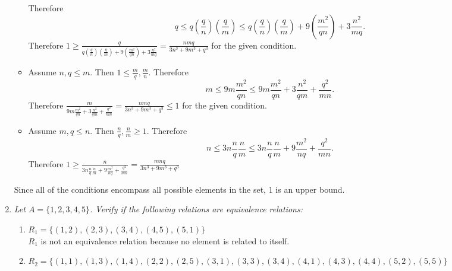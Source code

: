 \documentclass[12pt, letterpaper]{article}
\begin{document}
\begin{enumerate}
\begin{itemize}
		Therefore
		$$
		q \leq q(\frac{q}{n})(\frac{q}{m}) \leq q(\frac{q}{n})(\frac{q}{m}) + 9(\frac{m^2}{qn}) + 3\frac{n^2}{mq}.
		$$
		Therefore $1 \geq \frac{q}{q(\frac{q}{n})(\frac{q}{m}) + 9(\frac{m^2}{qn}) + 3\frac{n^2}{mq}} = \frac{nmq}{3n^3 + 9m^3 + q^3}$ for the given condition.
		\item Assume $n,q \leq m$. Then $1\leq \frac{m}{q},\frac{m}{n}$.
		Therefore
		$$
		m \leq 9 m \frac{m^2}{qn} \leq 9 m \frac{m^2}{qn} + 3\frac{n^2}{qm} + \frac{q^2}{mn}.
		$$
		Therefore $\frac{m}{9 m \frac{m^2}{qn} + 3\frac{n^2}{qm} + \frac{q^2}{mn}} = \frac{nmq}{3n^3 + 9m^3 + q^3} \leq 1$ for the given condition.  
		\item Assume $m,q \leq n$.  Then $\frac{n}{q},\frac{n}{m} \geq 1$.
		Therefore
		$$
		n \leq 3n\frac{n}{q}\frac{n}{m} \leq 3n\frac{n}{q}\frac{n}{m} + 9\frac{m^2}{nq} + \frac{q^2}{mn}.
		$$
		Therefore $1 \geq \frac{n}{3n\frac{n}{q}\frac{n}{m} + 9\frac{m^2}{nq} + \frac{q^2}{mn}} = \frac{mnq}{3n^3 + 9m^3 + q^3}$
	\end{itemize}
	Since all of the conditions encompass all possible elements in the set, 1 is an upper bound.  
	
	\item \textit{Let $A = \{1, 2, 3, 4, 5\}$. Verify if the following relations are equivalence relations:}
	
	
	\begin{enumerate}
		\item $R_1 = \{(1, 2), (2, 3), (3, 4), (4, 5), (5, 1)\}$\\
		
		$R_1$ is not an equivalence relation because no element is related to itself.
		
		\item $
		R_2 = \{(1, 1), (1, 3), (1, 4), (2, 2), (2, 5), (3, 1), (3, 3), (3, 4), (4, 1), (4, 3), (4, 4), (5, 2), (5, 5)\}		
		$\\
		

\end{enumerate}
\end{enumerate}
\end{document}
